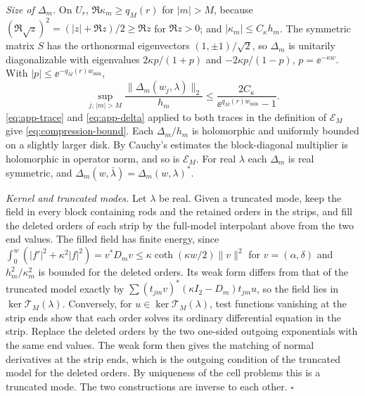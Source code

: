 \emph{Size of $\Delta_m$.} On $U_r$, $\Re\kappa_m\ge q_M(r)$ for $|m|>M$, because
$(\Re\sqrt z)^2=(|z|+\Re z)/2\ge\Re z$ for $\Re z>0$; and $|\kappa_m|\le C_\kappa h_m$.
The symmetric matrix $S$ has the orthonormal eigenvectors $(1,\pm1)/\sqrt2$, so
$\Delta_m$ is unitarily diagonalizable with eigenvalues $2\kappa p/(1+p)$ and
$-2\kappa p/(1-p)$, $p=\ee^{-\kappa w}$. With $|p|\le\ee^{-q_M(r)w_{\min}}$,
\begin{equation}\label{eq:app-delta}
  \sup_{j,\,|m|>M}\frac{\|\Delta_m(w_j,\lambda)\|_2}{h_m}
  \le\frac{2C_\kappa}{\ee^{q_M(r)w_{\min}}-1}.
\end{equation}
\eqref{eq:app-trace} and \eqref{eq:app-delta} applied to both traces in the
definition of $\mathcal E_M$ give \eqref{eq:compression-bound}. Each
$\Delta_m/h_m$ is holomorphic and uniformly bounded on a slightly larger disk.
By Cauchy's estimates the block-diagonal multiplier is holomorphic in
operator norm, and so is $\mathcal E_M$. For real $\lambda$ each $\Delta_m$ is real
symmetric, and $\Delta_m(w,\bar\lambda)=\Delta_m(w,\lambda)^*$.

\emph{Kernel and truncated modes.} Let $\lambda$ be real. Given a truncated mode,
keep the field in every block containing rods and the retained orders in the
strips, and fill the deleted orders of each strip by the full-model
interpolant above from the two end values. The filled field has finite energy,
since $\int_0^w(|f'|^2+\kappa^2|f|^2)=v^*D_mv\le\kappa\coth(\kappa w/2)\|v\|^2$ for
$v=(\alpha,\delta)$ and $h_m^2/\kappa_m^2$ is bounded for the deleted orders. Its
weak form differs from that of the truncated model exactly by
$\sum(t_{jm}v)^*(\kappa I_2-D_m)t_{jm}u$, so the field lies in
$\ker\mathcal T_M(\lambda)$. Conversely, for $u\in\ker\mathcal T_M(\lambda)$, test
functions vanishing at the strip ends show that each order solves its
ordinary differential equation in the strip. Replace the deleted orders by
the two one-sided outgoing exponentials with the same end values. The weak
form then gives the matching of normal derivatives at the strip ends, which is
the outgoing condition of the truncated model for the deleted orders. By
uniqueness of the cell problems this is a truncated mode. The two
constructions are inverse to each other. \qquad$\square$

